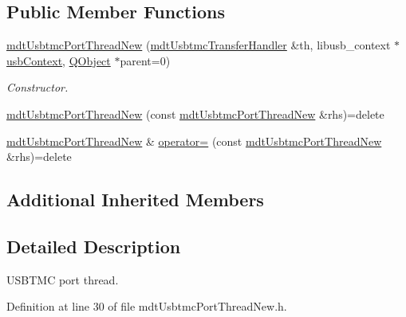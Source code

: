 \subsection*{Public Member Functions}
\begin{DoxyCompactItemize}
\item 
\hyperlink{classmdt_usbtmc_port_thread_new_ad26bff8c543252e40db2c26c9699039a}{mdt\-Usbtmc\-Port\-Thread\-New} (\hyperlink{classmdt_usbtmc_transfer_handler}{mdt\-Usbtmc\-Transfer\-Handler} \&th, libusb\-\_\-context $\ast$\hyperlink{classmdt_usb_port_thread_new_a236b21eb4da1bfb1918c2d30afc85ef5}{usb\-Context}, \hyperlink{class_q_object}{Q\-Object} $\ast$parent=0)
\begin{DoxyCompactList}\small\item\em Constructor. \end{DoxyCompactList}\item 
\hyperlink{classmdt_usbtmc_port_thread_new_a38635c8efafa35f7ceda41f1ef8df534}{mdt\-Usbtmc\-Port\-Thread\-New} (const \hyperlink{classmdt_usbtmc_port_thread_new}{mdt\-Usbtmc\-Port\-Thread\-New} \&rhs)=delete
\item 
\hyperlink{classmdt_usbtmc_port_thread_new}{mdt\-Usbtmc\-Port\-Thread\-New} \& \hyperlink{classmdt_usbtmc_port_thread_new_a55525a82833f0966973691be89bed44d}{operator=} (const \hyperlink{classmdt_usbtmc_port_thread_new}{mdt\-Usbtmc\-Port\-Thread\-New} \&rhs)=delete
\end{DoxyCompactItemize}
\subsection*{Additional Inherited Members}


\subsection{Detailed Description}
U\-S\-B\-T\-M\-C port thread. 

Definition at line 30 of file mdt\-Usbtmc\-Port\-Thread\-New.\-h.



